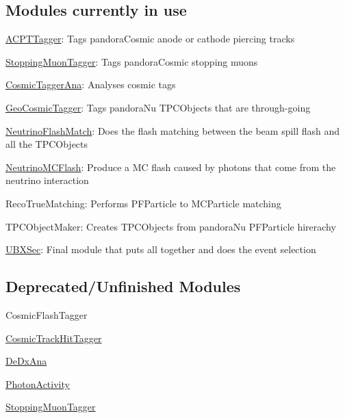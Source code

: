 \subsection*{Modules currently in use}


\begin{DoxyItemize}
\item \hyperlink{classACPTTagger}{A\-C\-P\-T\-Tagger}\-: Tags pandora\-Cosmic anode or cathode piercing tracks
\item \hyperlink{classStoppingMuonTagger}{Stopping\-Muon\-Tagger}\-: Tags pandora\-Cosmic stopping muons
\item \hyperlink{classCosmicTaggerAna}{Cosmic\-Tagger\-Ana}\-: Analyses cosmic tags
\item \hyperlink{classGeoCosmicTagger}{Geo\-Cosmic\-Tagger}\-: Tags pandora\-Nu T\-P\-C\-Objects that are through-\/going
\item \hyperlink{classNeutrinoFlashMatch}{Neutrino\-Flash\-Match}\-: Does the flash matching between the beam spill flash and all the T\-P\-C\-Objects
\item \hyperlink{classNeutrinoMCFlash}{Neutrino\-M\-C\-Flash}\-: Produce a M\-C flash caused by photons that come from the neutrino interaction
\item Reco\-True\-Matching\-: Performs P\-F\-Particle to M\-C\-Particle matching
\item T\-P\-C\-Object\-Maker\-: Creates T\-P\-C\-Objects from pandora\-Nu P\-F\-Particle hirerachy
\item \hyperlink{classUBXSec}{U\-B\-X\-Sec}\-: Final module that puts all together and does the event selection
\end{DoxyItemize}

\subsection*{Deprecated/\-Unfinished Modules}


\begin{DoxyItemize}
\item Cosmic\-Flash\-Tagger
\item \hyperlink{classCosmicTrackHitTagger}{Cosmic\-Track\-Hit\-Tagger}
\item \hyperlink{classDeDxAna}{De\-Dx\-Ana}
\item \hyperlink{classPhotonActivity}{Photon\-Activity}
\item \hyperlink{classStoppingMuonTagger}{Stopping\-Muon\-Tagger} 
\end{DoxyItemize}